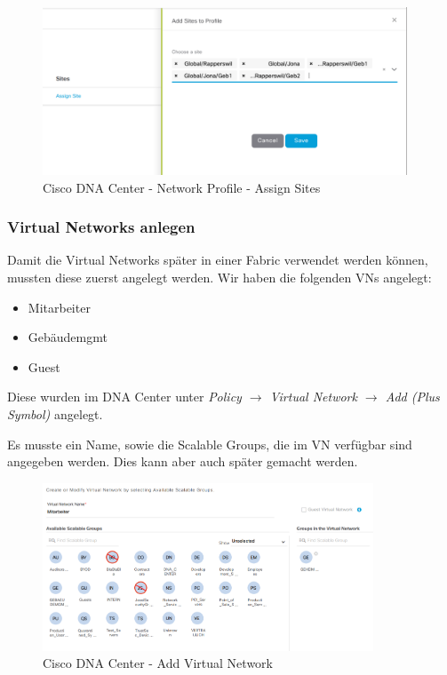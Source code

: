 \begin{figure}[H]
	\centering
	\includegraphics[height=5cm]{img/secondtry/dna-center-network-profile-assign-sites.png}
	\caption{Cisco DNA Center - Network Profile - Assign Sites}
	\label{fig:dna-center-network-profile-assign-sites}
\end{figure}

\subsubsection{Virtual Networks anlegen}

Damit die Virtual Networks später in einer Fabric verwendet werden können, mussten diese zuerst angelegt werden. Wir haben die folgenden VNs angelegt:
\begin{itemize}
	\item Mitarbeiter
	\item Gebäudemgmt
	\item Guest
\end{itemize}

Diese wurden im DNA Center unter \textit{Policy $\rightarrow$ Virtual Network $\rightarrow$ Add (Plus Symbol)} angelegt.

Es musste ein Name, sowie die Scalable Groups, die im VN verfügbar sind angegeben werden. Dies kann aber auch später gemacht werden.

\begin{figure}[H]
	\centering
	\includegraphics[height=5cm]{img/secondtry/dna-center-add-vn.png}
	\caption{Cisco DNA Center - Add Virtual Network}
	\label{fig:dna-center-add-vn}
\end{figure}


